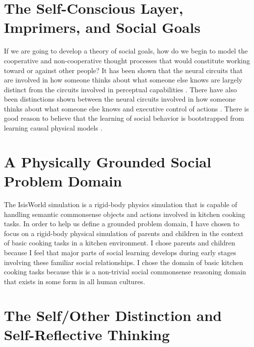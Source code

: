 \section{The Self-Conscious Layer, Imprimers, and Social Goals}

If we are going to develop a theory of social goals, how do we begin
to model the cooperative and non-cooperative thought processes that
would constitute working toward or against other people? It has been
shown that the neural circuits that are involved in how someone thinks
about what someone else knows are largely distinct from the circuits
involved in perceptual capabilities \cite[]{bedny:2009}. There have
also been distinctions shown between the neural circuits involved in
how someone thinks about what someone else knows and executive control
of actions \cite[]{saxe:2006}. There is good reason to believe that
the learning of social behavior is bootstrapped from learning causal
physical models \cite[]{perner:1991}.

\section{A Physically Grounded Social Problem Domain}

The IsisWorld simulation \cite[]{smith:2010} is a rigid-body physics
simulation that is capable of handling semantic commonsense objects
and actions involved in kitchen cooking tasks.  In order to help us
define a grounded problem domain, I have chosen to focus on a
rigid-body physical simulation of parents and children in the context
of basic cooking tasks in a kitchen environment. I chose parents and
children because I feel that major parts of social learning develops
during early stages involving these familiar social relationships. I
chose the domain of basic kitchen cooking tasks because this is a
non-trivial social commonsense reasoning domain that exists in some
form in all human cultures.

\section{The Self/Other Distinction and Self-Reflective Thinking}

